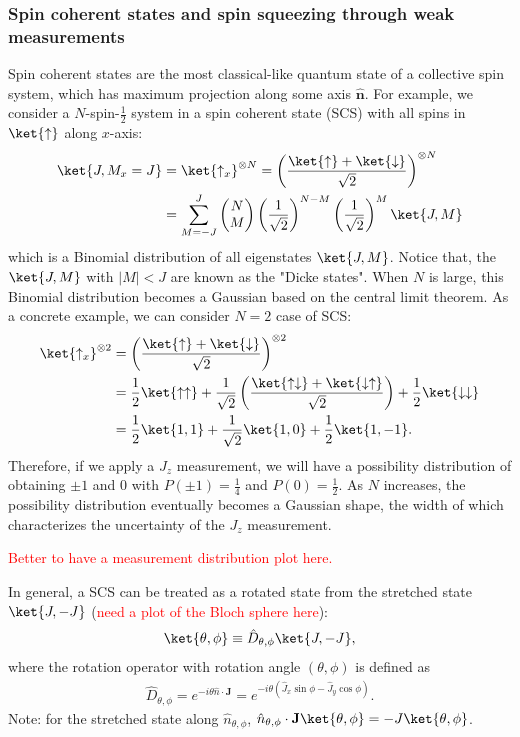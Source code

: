 \documentclass[]{report}
\begin{document}
\subsubsection{Spin coherent states and spin squeezing through weak measurements}
Spin coherent states are the most classical-like quantum state of a collective spin system, which has maximum projection along some axis $ \hat{\mathbf{n}} $. For example, we consider a $ N $-spin-$ \frac{1}{2} $ system in a spin coherent state (SCS) with all spins in $ \ket{\uparrow} $ along $ x $-axis:
\begin{subequations}\label{eq:SCSJx}
\begin{align}
\ket{J,M_x=J} &=\ket{\uparrow_x}^{\otimes N} = \left(\frac{\ket{\uparrow}+\ket{\downarrow}}{\sqrt{2}}\right)^{\otimes N}\\
&= \sum_{M=-J}^J \left( \begin{matrix}N\\ M \end{matrix} \right) \left( \frac{1}{\sqrt{2}}\right)^{N-M} \left( \frac{1}{\sqrt{2}}\right)^{M} \ket{J,M}
\end{align}
\end{subequations}
which is a Binomial distribution of all eigenstates $ \ket{J,M} $. Notice that, the $ \ket{J,M} $ with $ |M|<J $ are known as the "Dicke states". 
When $ N $ is large, this Binomial distribution becomes a Gaussian based on the central limit theorem. As a concrete example, we can consider $ N=2 $ case of SCS:
\begin{align}
\ket{\uparrow_x}^{\otimes 2} &= \left(\frac{\ket{\uparrow}+\ket{\downarrow}}{\sqrt{2}}\right)^{\otimes 2}\\
&= \frac{1}{2}\ket{\uparrow\uparrow} +\frac{1}{\sqrt{2}}\left(\frac{\ket{\uparrow\downarrow}+\ket{\downarrow\uparrow}}{\sqrt{2}} \right) + \frac{1}{2}\ket{\downarrow\downarrow}\\
&= \frac{1}{2}\ket{1,1}+\frac{1}{\sqrt{2}}\ket{1,0}+\frac{1}{2}\ket{1,-1}.
\end{align}
Therefore, if we apply a $ J_z $ measurement, we will have a possibility distribution of obtaining $ \pm 1 $ and $ 0 $ with $ P(\pm 1)=\frac{1}{4} $ and $ P(0)=\frac{1}{2} $. As $ N $ increases, the possibility distribution eventually becomes a Gaussian shape, the width of which characterizes the uncertainty of the $ J_z $ measurement. 

\textcolor{red}{Better to have a measurement distribution plot here.}

In general, a SCS can be treated as a rotated state from the stretched state $ \ket{J,-J} $ (\textcolor{red}{need a plot of the Bloch sphere here}):
\begin{align}
\ket{\theta,\phi} \equiv \hat{D}_{\theta,\phi} \ket{J,-J},
\end{align} 
where the rotation operator with rotation angle $ (\theta,\phi) $ is defined as
\begin{align}
\hat{D}_{\theta,\phi} =e^{-i\theta\hat{n}\cdot \mathbf{J}}=e^{-i\theta (\hat{J}_x\sin \phi - \hat{J}_y\cos \phi) }. 
\end{align}
Note: for the stretched state along $ \hat{n}_{\theta,\phi} $, $ \hat{n}_{\theta,\phi}\cdot \mathbf{J}\ket{\theta,\phi}=-J\ket{\theta,\phi} $. 
\end{document}
